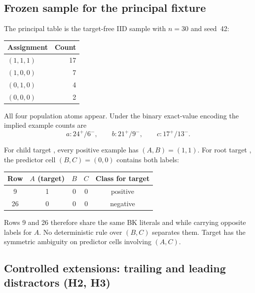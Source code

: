 \documentclass[11pt]{article}
\DeclareRobustCommand{\code}[1]{\texttt{\detokenize{#1}}}
\begin{document}
\subsection{Frozen sample for the principal fixture}

The principal table is the target-free IID sample with \(n=30\) and seed~42:

\begin{center}
\begin{tabular}{@{}lr@{}}
\toprule
Assignment & Count \\
\midrule
\((1,1,1)\) & 17 \\
\((1,0,0)\) & 7 \\
\((0,1,0)\) & 4 \\
\((0,0,0)\) & 2 \\
\bottomrule
\end{tabular}
\end{center}

All four population atoms appear. Under the binary exact-value encoding the
implied example counts are
\[
a:24^+/6^-,
\qquad
b:21^+/9^-,
\qquad
c:17^+/13^-.
\]

For child target \code{c}, every positive example has \((A,B)=(1,1)\). For root
target \code{a}, the predictor cell \((B,C)=(0,0)\) contains both labels:

\begin{center}
\begin{tabular}{@{}ccccc@{}}
\toprule
Row & \(A\) (target) & \(B\) & \(C\) & Class for target \code{a} \\
\midrule
9 & 1 & 0 & 0 & positive \\
26 & 0 & 0 & 0 & negative \\
\bottomrule
\end{tabular}
\end{center}

Rows 9 and 26 therefore share the same BK literals \code{b_val_0} and
\code{c_val_0} while carrying opposite labels for \(A\). No deterministic rule
over \((B,C)\) separates them. Target \code{b} has the symmetric ambiguity on
predictor cells involving \((A,C)\).

\subsection{Controlled extensions: trailing and leading distractors (H2, H3)}
\end{document}
